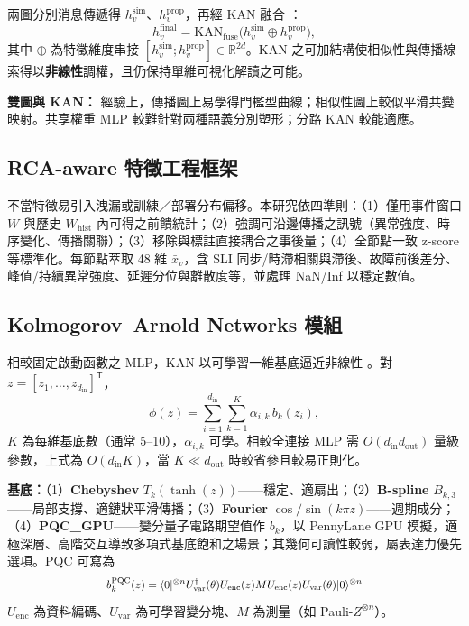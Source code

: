 \documentclass[conference]{IEEEtran}
\begin{document}
兩圖分別消息傳遞得 $h_v^{\mathrm{sim}}$、$h_v^{\mathrm{prop}}$，再經 KAN 融合 \cite{kan2024}：
\begin{equation}
h_v^{\mathrm{final}} = \mathrm{KAN}_{\mathrm{fuse}}\bigl(h_v^{\mathrm{sim}} \oplus h_v^{\mathrm{prop}}\bigr),
\end{equation}
其中 $\oplus$ 為特徵維度串接 $[h_v^{\mathrm{sim}}; h_v^{\mathrm{prop}}]\in\mathbb{R}^{2d}$。KAN 之可加結構使相似性與傳播線索得以\textbf{非線性}調權，且仍保持單維可視化解讀之可能。

\textbf{雙圖與 KAN：} 經驗上，傳播圖上易學得門檻型曲線；相似性圖上較似平滑共變映射。共享權重 MLP 較難針對兩種語義分別塑形；分路 KAN 較能適應。

\subsection{RCA-aware 特徵工程框架}
\label{sec:rca_feat}

不當特徵易引入洩漏或訓練／部署分布偏移。本研究依四準則：（1）僅用事件窗口 $W$ 與歷史 $W_{\mathrm{hist}}$ 內可得之前饋統計；（2）強調可沿邊傳播之訊號（異常強度、時序變化、傳播關聯）；（3）移除與標註直接耦合之事後量；（4）全節點一致 z-score 等標準化。每節點萃取 48 維 $\bar{x}_v$，含 SLI 同步/時滯相關與滯後、故障前後差分、峰值/持續異常強度、延遲分位與離散度等，並處理 NaN/Inf 以穩定數值。

\subsection{Kolmogorov--Arnold Networks 模組}

相較固定啟動函數之 MLP，KAN 以可學習一維基底逼近非線性 \cite{kan2024,kolmogorov1957}。對 $z=[z_1,\ldots,z_{d_{\mathrm{in}}}]^{\mathsf{T}}$，
\begin{equation}
\phi(z) = \sum_{i=1}^{d_{\mathrm{in}}} \sum_{k=1}^{K} \alpha_{i,k}\, b_k(z_i),
\end{equation}
$K$ 為每維基底數（通常 5--10），$\alpha_{i,k}$ 可學。相較全連接 MLP 需 $O(d_{\mathrm{in}} d_{\mathrm{out}})$ 量級參數，上式為 $O(d_{\mathrm{in}} K)$，當 $K\ll d_{\mathrm{out}}$ 時較省參且較易正則化。

\textbf{基底：}（1）\textbf{Chebyshev} $T_k(\tanh(z))$——穩定、適扇出；（2）\textbf{B-spline} $B_{k,3}$——局部支撐、適鏈狀平滑傳播；（3）\textbf{Fourier} $\cos/\sin(k\pi z)$——週期成分；（4）\textbf{PQC\_GPU}——變分量子電路期望值作 $b_k$，以 PennyLane \cite{pennylane} GPU 模擬，適極深層、高階交互導致多項式基底飽和之場景；其幾何可讀性較弱，屬表達力優先選項。PQC 可寫為
\begin{equation}
\scalebox{0.88}{$\displaystyle b_k^{\mathrm{PQC}}(z) = \langle 0|^{\otimes n} U_{\mathrm{var}}^\dagger(\theta) U_{\mathrm{enc}}(z) M U_{\mathrm{enc}}(z) U_{\mathrm{var}}(\theta) |0\rangle^{\otimes n}$}
\end{equation}
$U_{\mathrm{enc}}$ 為資料編碼、$U_{\mathrm{var}}$ 為可學習變分塊、$M$ 為測量（如 Pauli-$Z^{\otimes n}$）。
\end{document}
